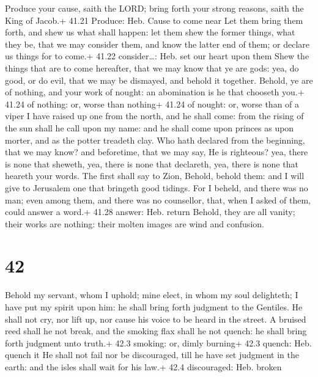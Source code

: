 Produce your cause, saith the LORD; bring forth your
strong reasons, saith the King of Jacob.+ 41.21 Produce: Heb. Cause to
come near  Let them bring them forth, and shew us what
shall happen: let them shew the former things, what they be, that we may
consider them, and know the latter end of them; or declare us things for
to come.+ 41.22 consider\ldots: Heb. set our heart upon them
 Shew the things that are to come hereafter, that we may
know that ye are gods: yea, do good, or do evil, that we may be
dismayed, and behold it together.  Behold, ye are of
nothing, and your work of nought: an abomination is he that chooseth
you.+ 41.24 of nothing: or, worse than nothing+ 41.24 of nought: or,
worse than of a viper  I have raised up one from the north,
and he shall come: from the rising of the sun shall he call upon my
name: and he shall come upon princes as upon morter, and as the potter
treadeth clay.  Who hath declared from the beginning, that
we may know? and beforetime, that we may say, He is righteous? yea,
there is none that sheweth, yea, there is none that declareth, yea,
there is none that heareth your words.  The first shall say
to Zion, Behold, behold them: and I will give to Jerusalem one that
bringeth good tidings.  For I beheld, and there was no man;
even among them, and there was no counsellor, that, when I asked of
them, could answer a word.+ 41.28 answer: Heb. return 
Behold, they are all vanity; their works are nothing: their molten
images are wind and confusion.

\hypertarget{section-41}{%
\section{42}\label{section-41}}

 Behold my servant, whom I uphold; mine elect, in whom my
soul delighteth; I have put my spirit upon him: he shall bring forth
judgment to the Gentiles.  He shall not cry, nor lift up,
nor cause his voice to be heard in the street.  A bruised
reed shall he not break, and the smoking flax shall he not quench: he
shall bring forth judgment unto truth.+ 42.3 smoking: or, dimly burning+
42.3 quench: Heb. quench it  He shall not fail nor be
discouraged, till he have set judgment in the earth: and the isles shall
wait for his law.+ 42.4 discouraged: Heb. broken

